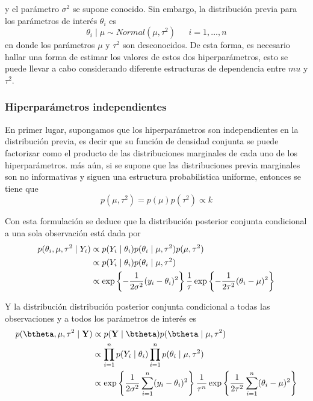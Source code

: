 \documentclass[10pt,openright]{book}\usepackage[]{graphicx}\usepackage[]{color}
\begin{document}
y el par\'ametro $\sigma^2$ se supone conocido. Sin embargo, la distribuci\'on previa para los par\'ametros de inter\'es $\theta_i$ es
\begin{equation*}
\theta_i \mid \mu \sim Normal(\mu, \tau^2) \ \ \ \ \ \ \ i=1,\ldots,n
\end{equation*}
en donde los par\'ametros $\mu$ y $\tau^2$ son desconocidos. De esta forma, es necesario hallar una forma de estimar los valores de estos dos hiperpar\'ametros, esto se puede llevar a cabo considerando diferente estructuras de dependencia entre $mu$ y $\tau^2$. 

\subsubsection{Hiperpar\'ametros independientes}
En primer lugar, supongamos que los hiperpar\'ametros son independientes en la distribuci\'on previa, es decir que su funci\'on de densidad conjunta se puede factorizar como el producto de las distribuciones marginales de cada uno de los hiperpar\'ametros. m\'as a\'un, si se supone que las distribuciones previa marginales son no informativas y siguen una estructura probabil\'istica uniforme, entonces se tiene que
\begin{equation*}
p(\mu,\tau^2)=p(\mu)p(\tau^2)\propto k
\end{equation*}

Con esta formulaci\'on se deduce que la distribuci\'on posterior conjunta condicional a una sola observaci\'on est\'a dada por
\begin{align}
p(\theta_i,\mu,\tau^2 \mid Y_i) &\propto p(Y_i \mid \theta_i)p(\theta_i \mid \mu,\tau^2)p(\mu,\tau^2) \notag \\
&\propto p(Y_i \mid \theta_i)p(\theta_i \mid \mu,\tau^2) \notag \\
&\propto \exp\left\{-\frac{1}{2\sigma^2}(y_i-\theta_i)^2\right\}
\frac{1}{\tau}\exp\left\{-\frac{1}{2\tau^2}(\theta_i-\mu)^2\right\}
\end{align}

Y la distribuci\'on distribuci\'on posterior conjunta condicional a todas las observaciones y a todos los par\'ametros de inter\'es es
\begin{align*}
p(\btheta,\mu,\tau^2 \mid \mathbf{Y})
&\propto p(\mathbf{Y} \mid \btheta)p(\btheta \mid \mu,\tau^2)  \\
&\propto \prod_{i=1}^n p(Y_i \mid \theta_i) \prod_{i=1}^n p(\theta_i \mid \mu,\tau^2)  \\
&\propto \exp\left\{\frac{1}{2\sigma^2}\sum_{i=1}^n(y_i-\theta_i)^2\right\}
\frac{1}{\tau^n}\exp\left\{\frac{1}{2\tau^2}\sum_{i=1}^n(\theta_i-\mu)^2\right\}
\end{align*}
\end{document}
